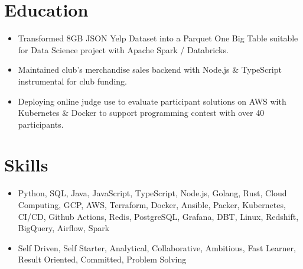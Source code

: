 \section{Education}
\begin{itemize}
  \item Transformed 8GB JSON Yelp Dataset into a Parquet One Big Table suitable for Data Science project with Apache Spark / Databricks.
  \item Maintained club's merchandise sales backend with Node.js \& TypeScript instrumental for club funding.
\end{itemize}
\begin{itemize}
  \item Deploying online judge use to evaluate participant solutions on AWS with Kubernetes \& Docker to support programming contest with over 40 participants. 
\end{itemize}
  
\section{Skills}
\begin{itemize}
  \item Python, SQL, Java, JavaScript, TypeScript, Node.js, Golang, Rust, Cloud Computing, GCP, AWS, Terraform, Docker, Ansible, Packer, Kubernetes, CI/CD, Github Actions, Redis, PostgreSQL, Grafana, DBT, Linux, Redshift, BigQuery, Airflow, Spark
  \item Self Driven, Self Starter, Analytical, Collaborative, Ambitious, Fast Learner, Result Oriented, Committed, Problem Solving
\end{itemize}
